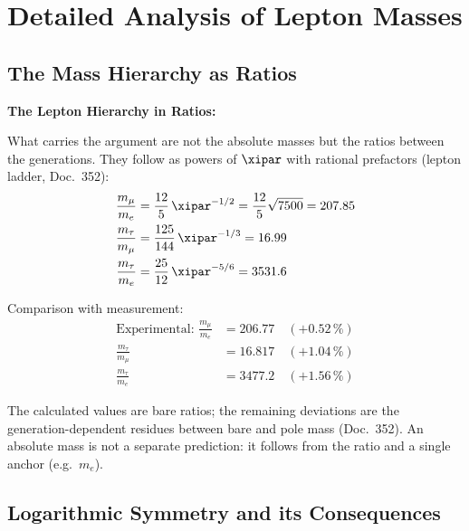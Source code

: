 	\section{Detailed Analysis of Lepton Masses}
	
	\subsection{The Mass Hierarchy as Ratios}
	
	\begin{relation}
		\textbf{The Lepton Hierarchy in Ratios:}
		
		What carries the argument are not the absolute masses but the ratios between the generations. They follow as powers of $\xipar$ with rational prefactors (lepton ladder, Doc.~352):
		\begin{align}
			\frac{m_\mu}{m_e} &= \frac{12}{5}\,\xipar^{-1/2} = \frac{12}{5}\sqrt{7500} = 207.85 \\
			\frac{m_\tau}{m_\mu} &= \frac{125}{144}\,\xipar^{-1/3} = 16.99 \\
			\frac{m_\tau}{m_e} &= \frac{25}{12}\,\xipar^{-5/6} = 3531.6
		\end{align}
		
		Comparison with measurement:
		\begin{align}
			\text{Experimental: } \frac{m_\mu}{m_e} &= 206.77 \quad (+0.52\,\%) \\
			\frac{m_\tau}{m_\mu} &= 16.817 \quad (+1.04\,\%) \\
			\frac{m_\tau}{m_e} &= 3477.2 \quad (+1.56\,\%)
		\end{align}
		
		The calculated values are bare ratios; the remaining deviations are the generation-dependent residues between bare and pole mass (Doc.~352). An absolute mass is not a separate prediction: it follows from the ratio and a single anchor (e.g.\ $m_e$).
		
	\end{relation}
	
	\subsection{Logarithmic Symmetry and its Consequences}
	

